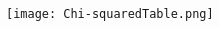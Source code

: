 \documentclass{article}
\newenvironment{Figure}
  {\par\medskip\noindent\minipage{\linewidth}}
  {\endminipage\par\medskip}
\begin{document}
\begin{multicols}{2}
\begin{Figure}
	\texttt{[image: Chi-squaredTable.png]}
\end{Figure}

\end{multicols}
\end{document}
